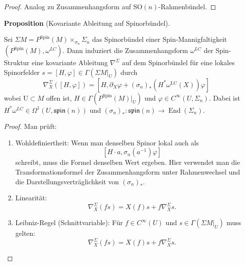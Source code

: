 \documentclass[10pt, letterpaper]{article}
\newcommand{\SO}{\mathrm{SO}}
\newcommand{\Spin}{\mathrm{Spin}}
\newcommand{\U}{\mathrm{U}}
\newcommand{\CustomHeading}[3]{%
  \par\medskip\noindent%
  \textbf{#1 #2} \textnormal{(#3)}.\enskip%
}
\newenvironment{PROP}[2]{\CustomHeading{Proposition}{#1}{#2}}{}
\begin{document}
\begin{proof}
  Analog zu Zusammenhangsform auf $\SO(n)$-Rahmenbündel.
\end{proof}

\begin{PROP}{}{Kovariante Ableitung auf Spinorbündel}
  Sei $\Sigma M= P^\Spin(M)\times_{\sigma_n}\Sigma_n$ das Spinorbündel einer Spin-Mannigfaltigkeit $(P^\Spin(M),\omega^{LC})$. Dann induziert die Zusammenhangsform $\omega^{LC}$ der Spin-Struktur eine kovariante Ableitung $\nabla^\Sigma$ auf dem Spinorbündel für eine lokales Spinorfelder $s=[H,\varphi]\in\Gamma(\Sigma M|_U)$ durch
  $$\nabla_X^\Sigma \left([H,\varphi]\right)=\left[H, \partial_X \varphi+\left(\sigma_n\right)_*\left(H^*\omega^{\mathrm{LC}}(X)\right) \varphi\right]$$ 
  wobei $\U\subset M$ offen ist, $H\in\Gamma(P^\Spin(M)|_U)$ und $\varphi\in C^\infty(U,\Sigma_n)$. Dabei ist $H^*\omega^{LC}\in \Omega^1(U,\mathfrak{spin}(n))$ und $\left(\sigma_n\right)_*: \mathfrak{spin}(n) \rightarrow \operatorname{End}\left(\Sigma_n\right)$.
\end{PROP}

\begin{proof}
  {\color{blue}Man prüft:
  \begin{enumerate}
    \item Wohldefiniertheit: Wenn man denselben Spinor lokal auch als
    $$
    \left[H \cdot a, \sigma_n\left(a^{-1}\right) \varphi\right]
    $$
    schreibt, muss die Formel denselben Wert ergeben. Hier verwendet man die Transformationsformel der Zusammenhangsform unter Rahmenwechsel und die Darstellungsverträglichkeit von $\left(\sigma_n\right)_*$.
    \item Linearität: 
    $$
    \nabla_X^{\Sigma}(f s)=X(f) s+f \nabla_X^{\Sigma} s .
    $$
    \item Leibniz-Regel (Schnittvariable): Für $f \in C^{\infty}(U)$ und $s \in \Gamma\left(\left.\Sigma M\right|_U\right)$ muss gelten:
    $$
    \nabla_X^{\Sigma}(f s)=X(f) s+f \nabla_X^{\Sigma} s .
    $$
  \end{enumerate}}
\end{proof}
\end{document}
